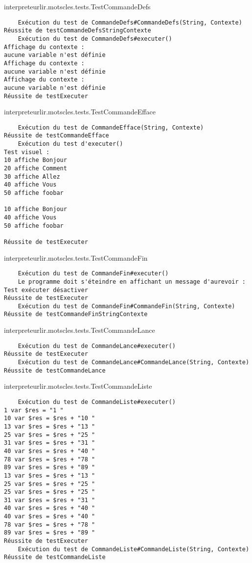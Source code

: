 \begin{enum}
    \item interpreteurlir.motscles.tests.TestCommandeDefs
\begin{verbatim}
    Exécution du test de CommandeDefs#CommandeDefs(String, Contexte)
Réussite de testCommandeDefsStringContexte
    Exécution du test de CommandeDefs#executer()
Affichage du contexte :
aucune variable n'est définie
Affichage du contexte :
aucune variable n'est définie
Affichage du contexte :
aucune variable n'est définie
Réussite de testExecuter
\end{verbatim}

    \item interpreteurlir.motscles.tests.TestCommandeEfface
\begin{verbatim}
    Exécution du test de CommandeEfface(String, Contexte)
Réussite de testCommandeEfface
    Exécution du test d'executer()
Test visuel :
10 affiche Bonjour
20 affiche Comment
30 affiche Allez
40 affiche Vous
50 affiche foobar

10 affiche Bonjour
40 affiche Vous
50 affiche foobar

Réussite de testExecuter
\end{verbatim}

    \item interpreteurlir.motscles.tests.TestCommandeFin
\begin{verbatim}
    Exécution du test de CommandeFin#executer()
    Le programme doit s'éteindre en affichant un message d'aurevoir :
Test exécuter désactiver
Réussite de testExecuter
    Exécution du test de CommandeFin#CommandeFin(String, Contexte)
Réussite de testCommandeFinStringContexte
\end{verbatim}

    \item interpreteurlir.motscles.tests.TestCommandeLance
\begin{verbatim}
    Exécution du test de CommandeLance#executer()
Réussite de testExecuter
    Exécution du test de CommandeLance#CommandeLance(String, Contexte)
Réussite de testCommandeLance
\end{verbatim}

    \item interpreteurlir.motscles.tests.TestCommandeListe
\begin{verbatim}
    Exécution du test de CommandeListe#executer()
1 var $res = "1 "
10 var $res = $res + "10 "
13 var $res = $res + "13 "
25 var $res = $res + "25 "
31 var $res = $res + "31 "
40 var $res = $res + "40 "
78 var $res = $res + "78 "
89 var $res = $res + "89 "
13 var $res = $res + "13 "
25 var $res = $res + "25 "
25 var $res = $res + "25 "
31 var $res = $res + "31 "
40 var $res = $res + "40 "
40 var $res = $res + "40 "
78 var $res = $res + "78 "
89 var $res = $res + "89 "
Réussite de testExecuter
    Exécution du test de CommandeListe#CommandeListe(String, Contexte)
Réussite de testCommandeListe
\end{verbatim}


\end{enum}
